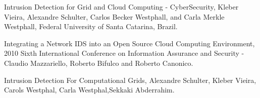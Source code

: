 \documentclass[journal]{IEEEtran}
\begin{document}
\begin{thebibliography}{1}

Intrusion Detection for Grid and Cloud Computing - CyberSecurity, Kleber Vieira, Alexandre Schulter, Carlos Becker Westphall, and Carla Merkle Westphall, Federal University of Santa Catarina, Brazil.

Integrating a Network IDS into an Open Source Cloud Computing Environment, 2010 Sixth International Conference on Information Assurance and Security - Claudio Mazzariello, Roberto Bifulco and Roberto Canonico.

Intrusion Detection For Computational Grids, Alexandre Schulter, Kleber Vieira, Carols Westphal, Carla Westphal,Sekkaki Abderrahim.

\end{thebibliography}
\end{document}
